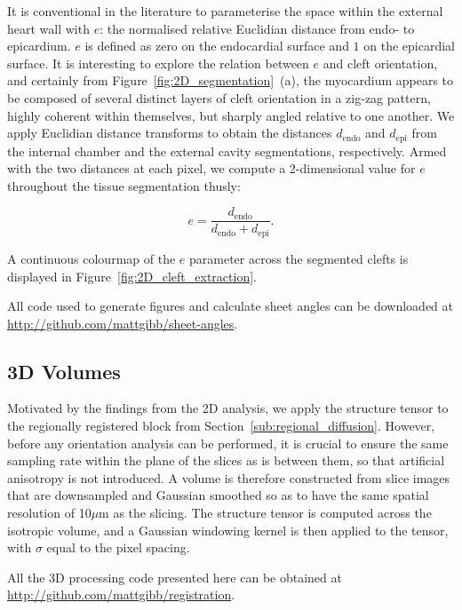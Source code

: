     It is conventional in the literature to parameterise the space within the external heart wall with $e$: the normalised relative Euclidian distance from endo- to epicardium. $e$ is defined as zero on the endocardial surface and $1$ on the epicardial surface. It is interesting to explore the relation between $e$ and cleft orientation, and certainly from Figure~\ref{fig:2D_segmentation}~(a), the myocardium appears to be composed of several distinct layers of cleft orientation in a zig-zag pattern, highly coherent within themselves, but sharply angled relative to one another. We apply Euclidian distance transforms to obtain the distances $d_{\text{endo}}$ and $d_{\text{epi}}$ from the internal chamber and the external cavity segmentations, respectively. Armed with the two distances at each pixel, we compute a 2-dimensional value for $e$ throughout the tissue segmentation thusly:
  
    \begin{equation}
      e = \frac{d_{\text{endo}}}{d_{\text{endo}} + d_{\text{epi}} }.
    \end{equation}
  
    A continuous colourmap of the $e$ parameter across the segmented clefts is displayed in Figure~\ref{fig:2D_cleft_extraction}.
    
    All code used to generate figures and calculate sheet angles can be downloaded at \url{http://github.com/mattgibb/sheet-angles}.
  
  \subsection{3D Volumes} %
  \label{sub:3d_volumes}
    Motivated by the findings from the 2D analysis, we apply the structure tensor to the regionally registered block from Section~\ref{sub:regional_diffusion}. However, before any orientation analysis can be performed, it is crucial to ensure the same sampling rate within the plane of the slices as is between them, so that artificial anisotropy is not introduced. A volume is therefore constructed from slice images that are downsampled and Gaussian smoothed so as to have the same spatial resolution of 10$\mu$m as the slicing. The structure tensor is computed across the isotropic volume, and a Gaussian windowing kernel is then applied to the tensor, with $\sigma$ equal to the pixel spacing.
  
    All the 3D processing code presented here can be obtained at \url{http://github.com/mattgibb/registration}.

